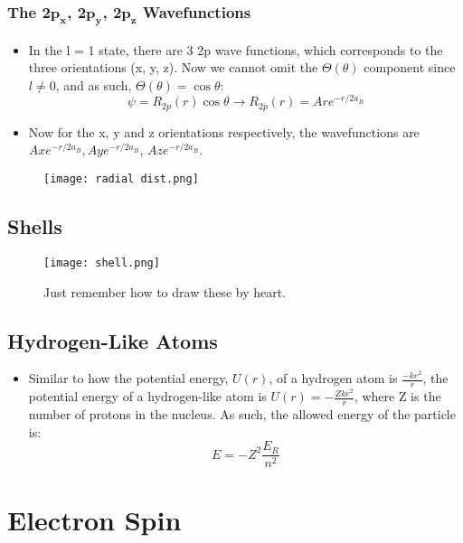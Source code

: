 \documentclass[12pt, letterpaper, twoside]{article}
\begin{document}
\subsubsection{The 2$\mathbf{p_x}$, 2$\mathbf{p_y}$, 2$\mathbf{p_z}$ Wavefunctions}

\begin{itemize}
    \item In the l = 1 state, there are 3 2p wave functions, which corresponds to the three orientations (x, y, z). Now we cannot omit the $\Theta(\theta)$ component since $l \neq 0$, and as such, $\Theta(\theta) = \cos{\theta}$:
    \begin{equation*}
        \psi = R_{2p}(r)\cos{\theta} \longrightarrow R_{2p}(r) = Are^{-r/2a_B}
    \end{equation*}
    \item Now for the x, y and z orientations respectively, the wavefunctions are $Axe^{-r/2a_B}, Aye^{-r/2a_B}$, $Aze^{-r/2a_B}$.
\end{itemize}
\begin{figure}[!ht]
    \centering
    \texttt{[image: radial dist.png]}
\end{figure}
\subsection{Shells}

\begin{figure}[!ht]
    \centering
    \texttt{[image: shell.png]}
    \caption{Just remember how to draw these by heart.}
    \label{fig:my_label}
\end{figure}

\subsection{Hydrogen-Like Atoms}

\begin{itemize}
    \item Similar to how the potential energy, $U(r)$, of a hydrogen atom is $\frac{-ke^2}{r}$, the potential energy of a hydrogen-like atom is $U(r) = -\frac{Zke^2}{r}$, where Z is the number of protons in the nucleus. As such, the allowed energy of the particle is:
    \begin{equation*}
        E = -Z^2\frac{E_R}{n^2}
    \end{equation*}
\end{itemize}

\section{Electron Spin}
\end{document}

